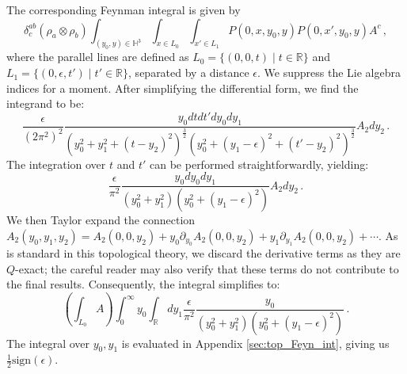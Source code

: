 \documentclass[11pt]{article}
\newcommand{\R}{\mathbb{R}}
\numberwithin{equation}{section}
\begin{document}
The corresponding Feynman integral is given by
\begin{equation}
	\delta^{ab}_c(\rho_a\otimes \rho_b)\int_{(y_0,y)\in \mathbb{H}^3}\int_{x \in L_0}\int_{x' \in L_1}P(0,x,y_0,y)P(0,x',y_0,y)A^c\,,
\end{equation}
where the parallel lines are defined as $L_0 = \{(0, 0, t) \mid t \in \R \}$ and $L_1 = \{(0, \epsilon, t') \mid t' \in \R \}$, separated by a distance $\epsilon$. We suppress the Lie algebra indices for a moment. After simplifying the differential form, we find the integrand to be:
\begin{equation}
	\frac{\epsilon}{(2\pi^2)^2}\frac{y_0dtdt'dy_0dy_1}{(y_0^2 + y_1^2 + (t - y_2)^2)^{\frac{3}{2}}(y_0^2 + (y_1-\epsilon)^2 + (t' - y_2)^2)^{\frac{3}{2}}}A_{2}dy_2\,.
\end{equation}
The integration over $t$ and $t'$ can be performed straightforwardly, yielding:
\begin{equation}
	\frac{\epsilon}{\pi^2}\frac{y_0dy_0dy_1}{(y_0^2 + y_1^2)(y_0^2 + (y_1-\epsilon)^2 )}A_{2}dy_2\,.
\end{equation}
We then Taylor expand the connection $A_{2}(y_0, y_1, y_2) = A_2(0, 0, y_2) + y_0 \partial_{y_0} A_2(0, 0, y_2) + y_1 \partial_{y_1} A_2(0, 0, y_2) + \cdots$. As is standard in this topological theory, we discard the derivative terms as they are $Q$-exact; the careful reader may also verify that these terms do not contribute to the final results. Consequently, the integral simplifies to:
\begin{equation}
	\left(\int_{L_0}A\right) \int_0^\infty y_0 \int_{\R}dy_1 \frac{\epsilon}{\pi^2}\frac{y_0}{(y_0^2 + y_1^2)(y_0^2 + (y_1-\epsilon)^2 )}\,.
\end{equation}
The integral over $y_0,y_1$ is evaluated in Appendix \ref{sec:top_Feyn_int}, giving us $\frac{1}{2}\mathrm{sign}(\epsilon)$.
\end{document}
